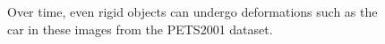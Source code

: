 \begin{Body}
								\begin{figure}[t]
								\centering
								\caption{Over time, even rigid objects can undergo deformations such as the car in these images from the PETS2001 dataset.}
								\label{Fig:PETS2001_deformation}
								\end{figure}


\end{Body}
